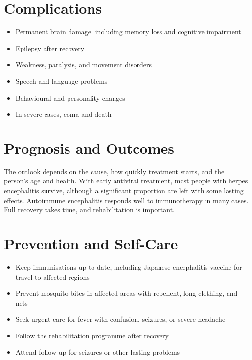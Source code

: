 \section*{Complications}
\begin{itemize}
    \item Permanent brain damage, including memory loss and cognitive impairment
    \item Epilepsy after recovery
    \item Weakness, paralysis, and movement disorders
    \item Speech and language problems
    \item Behavioural and personality changes
    \item In severe cases, coma and death
\end{itemize}

\section*{Prognosis and Outcomes}
The outlook depends on the cause, how quickly treatment starts, and the person's age and health. With early antiviral treatment, most people with herpes encephalitis survive, although a significant proportion are left with some lasting effects. Autoimmune encephalitis responds well to immunotherapy in many cases. Full recovery takes time, and rehabilitation is important.

\section*{Prevention and Self-Care}
\begin{itemize}
    \item Keep immunisations up to date, including Japanese encephalitis vaccine for travel to affected regions
    \item Prevent mosquito bites in affected areas with repellent, long clothing, and nets
    \item Seek urgent care for fever with confusion, seizures, or severe headache
    \item Follow the rehabilitation programme after recovery
    \item Attend follow-up for seizures or other lasting problems
\end{itemize}

